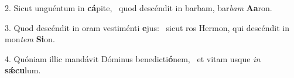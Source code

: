 2. Sicut unguéntum in \textbf{cá}pite, \ast\  quod descéndit in barbam, bar\textit{bam} \textbf{A}\textbf{a}ron.\

3. Quod descéndit in oram vestiménti \textbf{e}jus: \ast\  sicut ros Hermon, qui descéndit in mon\textit{tem} \textbf{Si}on.\

4. Quóniam illic mandávit Dóminus benedicti\textbf{ó}nem, \ast\  et vitam usque \textit{in} \textbf{sǽ}\textbf{cu}lum.\

